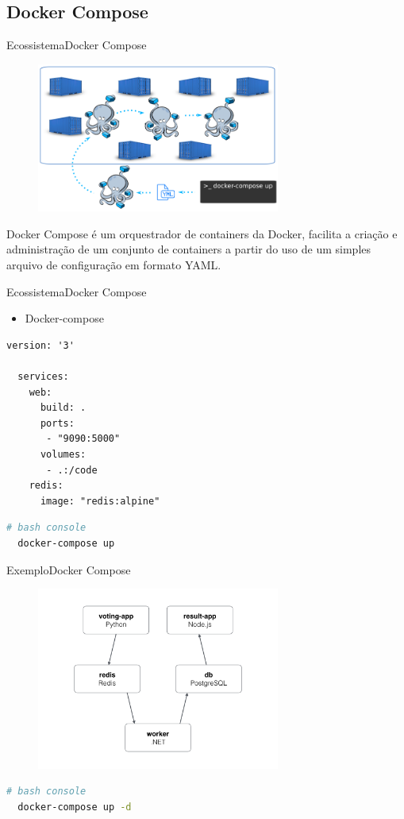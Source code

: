 \subsection{Docker Compose}
\begin{frame}{Ecossistema}{Docker Compose}
  \begin{figure}[ht!]
    \centering
    \includegraphics[width=80mm]{images/docker_compose}
  \end{figure}
  Docker Compose é um orquestrador de containers da Docker, facilita a criação e administração de um conjunto de containers a partir do uso de um simples arquivo de configuração em formato YAML.
\end{frame}

\begin{frame}[fragile]{Ecossistema}{Docker Compose}
  \begin{itemize}
    \item<1-> Docker-compose
  \end{itemize}
  \begin{lstlisting}[language=docker]
  version: '3'

  services:
    web:
      build: .
      ports:
       - "9090:5000"
      volumes:
       - .:/code
    redis:
      image: "redis:alpine"
  \end{lstlisting}
  \begin{lstlisting}[language=bash]
  # bash console
  docker-compose up
  \end{lstlisting}
\end{frame}

\begin{frame}[fragile]{Exemplo}{Docker Compose}
  \begin{figure}[ht!]
    \centering
    \includegraphics[width=80mm]{images/vote_app.png}
  \end{figure}
  \begin{lstlisting}[language=bash]
  # bash console
  docker-compose up -d
  \end{lstlisting}
\end{frame}